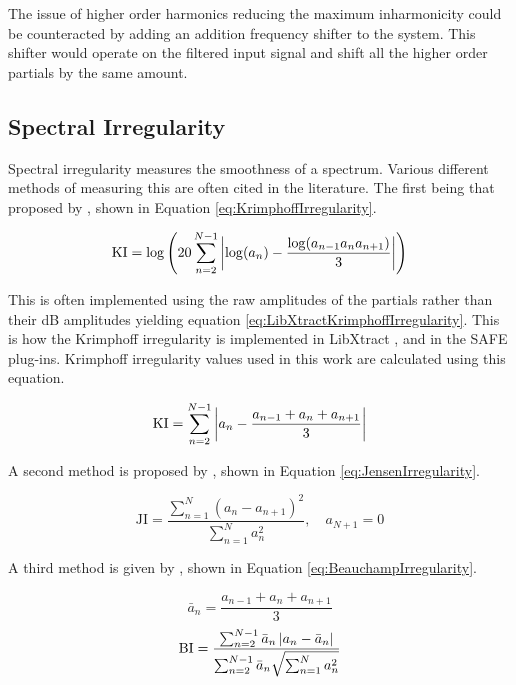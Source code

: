 			The issue of higher order harmonics reducing the maximum inharmonicity could be counteracted by
			adding an addition frequency shifter to the system. This shifter would operate on the filtered
			input signal and shift all the higher order partials by the same amount.

	\subsection{Spectral Irregularity}
	\label{sec:FeatureControl-Parameterisation-Irregularity}
		Spectral irregularity measures the smoothness of a spectrum. Various different methods of measuring this
		are often cited in the literature. The first being that proposed by \citet{krimphoff1994caracterisation},
		shown in Equation \ref{eq:KrimphoffIrregularity}.

		\begin{equation}
			\textrm{KI} = \log \left( 20 \sum_{n = 2}^{N - 1}
				                  \left|\log(a_{n}) - \frac{\log(a_{n-1}a_{n}a_{n+1})}{3}\right|
					   \right)
			\label{eq:KrimphoffIrregularity}
		\end{equation}

		This is often implemented using the raw amplitudes of the partials rather than their dB amplitudes yielding
		equation \ref{eq:LibXtractKrimphoffIrregularity}. This is how the Krimphoff irregularity is implemented
		in LibXtract \citep{bullock2007libxtract}, and in the SAFE plug-ins. Krimphoff irregularity values used in
		this work are calculated using this equation.

		\begin{equation}
			\textrm{KI} = \sum_{n = 2}^{N - 1}
					  \left|a_{n} - \frac{a_{n-1} + a_{n} + a_{n+1}}{3}\right|
			\label{eq:LibXtractKrimphoffIrregularity}
		\end{equation}
		

		A second method is proposed by \citet{jensen1999timbre}, shown in Equation \ref{eq:JensenIrregularity}.

		\begin{equation}
			\textrm{JI} = \frac{\sum_{n = 1}^{N} (a_{n} - a_{n+1})^{2}}
			                   {\sum_{n = 1}^{N} a_{n}^{2}},
			              \quad a_{N+1} = 0
			\label{eq:JensenIrregularity}
		\end{equation}

		A third method is given by \citet{beauchamp2007analysis}, shown in Equation \ref{eq:BeauchampIrregularity}.

		\[ \bar{a}_{n} = \frac{a_{n-1} + a_{n} + a_{n+1}}{3} \]
		\begin{equation}
			\textrm{BI} = \frac{\sum_{n = 2}^{N - 1} \bar{a}_{n} \left|a_{n} - \bar{a}_{n}\right|}
					   {\sum_{n = 2}^{N - 1} \bar{a}_{n} \sqrt{\sum_{n = 1}^{N} a_{n}^{2}}}
			\label{eq:BeauchampIrregularity}
		\end{equation}

